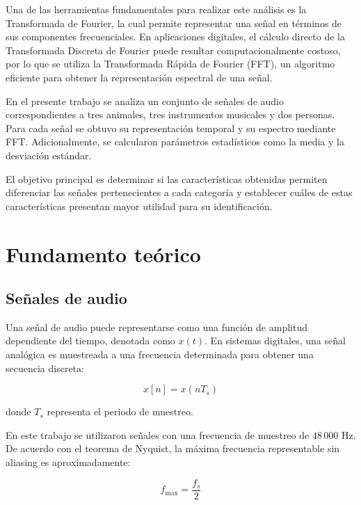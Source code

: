 \documentclass[conference]{IEEEtran}
\begin{document}
Una de las herramientas fundamentales para realizar este análisis es la Transformada de Fourier, la cual permite representar una señal en términos de sus componentes frecuenciales. En aplicaciones digitales, el cálculo directo de la Transformada Discreta de Fourier puede resultar computacionalmente costoso, por lo que se utiliza la Transformada Rápida de Fourier (FFT), un algoritmo eficiente para obtener la representación espectral de una señal.

En el presente trabajo se analiza un conjunto de señales de audio correspondientes a tres animales, tres instrumentos musicales y dos personas. Para cada señal se obtuvo su representación temporal y su espectro mediante FFT. Adicionalmente, se calcularon parámetros estadísticos como la media y la desviación estándar.

El objetivo principal es determinar si las características obtenidas permiten diferenciar las señales pertenecientes a cada categoría y establecer cuáles de estas características presentan mayor utilidad para su identificación.



\section{Fundamento teórico}


\subsection{Señales de audio}

Una señal de audio puede representarse como una función de amplitud dependiente del tiempo, denotada como $x(t)$. En sistemas digitales, una señal analógica es muestreada a una frecuencia determinada para obtener una secuencia discreta:

\begin{equation}
x[n] = x(nT_s)
\end{equation}

donde $T_s$ representa el periodo de muestreo.

En este trabajo se utilizaron señales con una frecuencia de muestreo de $48\,000$ Hz. De acuerdo con el teorema de Nyquist, la máxima frecuencia representable sin aliasing es aproximadamente:

\begin{equation}
f_{\max} = \frac{f_s}{2}
\end{equation}
\end{document}
